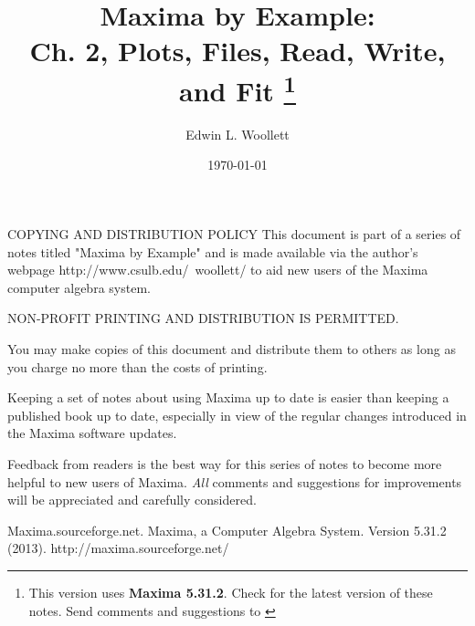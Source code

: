 \documentclass[11pt]{article}
\title{ Maxima by Example:\\ Ch. 2, Plots, Files, Read, Write, and Fit
             \thanks{This version uses \textbf{Maxima 5.31.2}. \;
			 Check \; \textbf{ \tedhome } \; for the latest version of these notes. Send comments and
			 suggestions to \textbf{\tedmail} } }
\author{ Edwin L. Woollett}
\date{\today}
\newcommand{\tcdb}{\textcolor{mdb}}
\newcommand{\tcbr}{\textcolor{BrickRed}}
\begin{document}
\maketitle
\small
\tableofcontents
\normalsize
{}
\newpage
\begin{myVerbatim2} 
COPYING AND DISTRIBUTION POLICY    
This document is part of a series of notes titled
"Maxima by Example" and is made available
via the author's webpage http://www.csulb.edu/~woollett/
to aid new users of the Maxima computer algebra system.	
	
NON-PROFIT PRINTING AND DISTRIBUTION IS PERMITTED.
	
You may make copies of this document and distribute them
to others as long as you charge no more than the costs of printing.	

Keeping a set of notes about using Maxima up to date is easier
than keeping a published book up to date, especially in view of
the regular changes introduced in the Maxima software updates.
\end{myVerbatim2}	
\smallskip
\noindent \tcbr{Feedback from readers is the best way for this series of notes
  to become more helpful to new users of Maxima}.
\tcdb{\emph{All} comments and suggestions for improvements will be appreciated and
  carefully considered}.
\smallskip
{} 
\smallskip
\begin{myVerbatim}
Maxima.sourceforge.net. Maxima, a Computer Algebra System. Version 5.31.2
 (2013). http://maxima.sourceforge.net/
\end{myVerbatim}   
\newpage
\setcounter{section}{2}
\pagestyle{headings}
\end{document}
